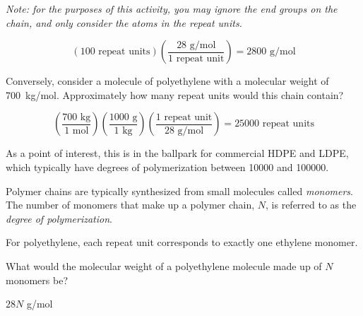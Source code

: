 \begin{activity}
\begin{ctqs}
				\emph{Note: for the purposes of this activity, you may ignore the  end groups on the chain, and only consider the atoms in the repeat units.}
	
		\begin{solution}[1.5in]
		
			\begin{equation*}
				\left(100\text{ repeat units}\right)\left(\frac{28\text{ g/mol}}{1\text{ repeat unit}}\right) = 2800\text{ g/mol}
			\end{equation*}
		\end{solution}
				
	\question Conversely, consider a molecule of polyethylene with a molecular weight of 700~kg/mol.  Approximately how many repeat units would this chain contain? \label{\labelbase:ctq:700kgPE}
	
		\begin{solution}[1.5in]
		\begin{equation*}
			\left(\frac{700\text{ kg}}{1\text{ mol}}\right)
			\left(\frac{1000\text{ g}}{1\text{ kg}}\right)
			\left(\frac{1\text{ repeat unit}}{28\text{ g/mol}}\right)
			= 25000\text{ repeat units}
		\end{equation*}
		
			As a point of interest, this is in the ballpark for commercial HDPE and LDPE, which typically have degrees of polymerization between 10000 and 100000.
		\end{solution}
	
\end{ctqs}

\begin{infobox}

	Polymer chains are typically synthesized from small molecules called \emph{monomers}.  The number of monomers that make up a polymer chain, $N$, is referred to as the \emph{degree of polymerization}.
	
	For polyethylene, each  repeat unit corresponds to exactly one ethylene monomer.

\end{infobox}

\begin{ctqs}
		
	\question What would the molecular weight of a polyethylene molecule made up of $N$ monomers be?
	
		\begin{solution}[1in]
			$28 N$ g/mol
		\end{solution}
		

\end{ctqs}
\end{activity}
